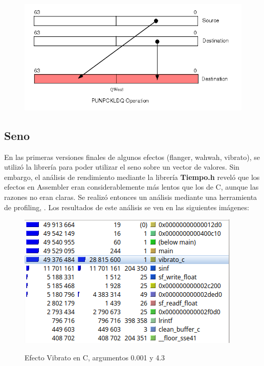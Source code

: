 \begin{figure}[H]
    \centering
    \includegraphics[scale=0.75]{imagenes/punpckldq.png}
    \label{fig:punpckldq}
    \caption{}
\end{figure}

\subsection{Seno}
\label{subsec:desarrollo-problemas-seno}
En las primeras versiones finales de algunos efectos (flanger, wahwah, vibrato), se utilizó la librería  para poder utilizar el seno sobre un vector de valores. Sin embargo, el análisis de rendimiento mediante la librería \textbf{Tiempo.h} reveló que los efectos en Assembler eran considerablemente más lentos que los de C, aunque las razones no eran claras. Se realizó entonces un análisis mediante una herramienta de profiling, . Los resultados de este análisis se ven en las siguientes imágenes:

\begin{figure}[H]
    \centering
    \includegraphics[scale=0.8]{imagenes/callgrind-c.png}
    \label{fig:callgrind-c-26787}
    \caption{Efecto Vibrato en C, argumentos 0.001 y 4.3}
\end{figure}

